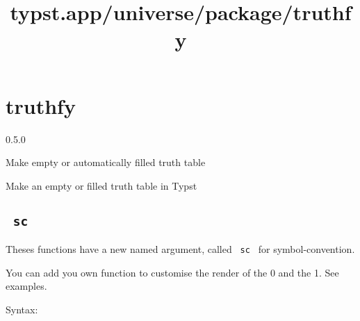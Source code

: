 \title{typst.app/universe/package/truthfy}

\label{banner}
\section{truthfy}\label{truthfy}

{ 0.5.0 }

Make empty or automatically filled truth table

\label{readme}
Make an empty or filled truth table in Typst

\begin{Shaded}
\begin{Highlighting}[]
\ErrorTok{(}\PreprocessorTok{[}\PreprocessorTok{]}\PreprocessorTok{[}\PreprocessorTok{]}\KeywordTok{)}\BuiltInTok{:}

\ErrorTok{(}\PreprocessorTok{[}\PreprocessorTok{]}\KeywordTok{)}\BuiltInTok{:}

\ErrorTok{(}\PreprocessorTok{[}\PreprocessorTok{]}\PreprocessorTok{[}\PreprocessorTok{]}\KeywordTok{)}\BuiltInTok{:}

\end{Highlighting}
\end{Shaded}

\subsection{\texorpdfstring{\texttt{\ sc\ }}{ sc }}\label{sc}

Theses functions have a new named argument, called \texttt{\ sc\ } for
symbol-convention.

You can add you own function to customise the render of the 0 and the 1.
See examples.

Syntax:

